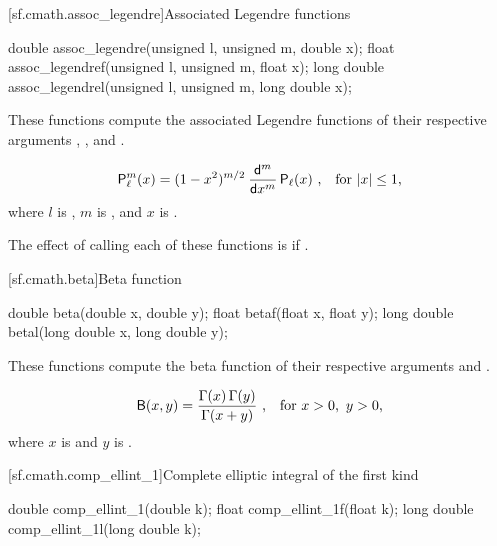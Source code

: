 [sf.cmath.assoc_legendre]{Associated Legendre functions}%
%
%
%
%
%
\begin{itemdecl}
double       assoc_legendre(unsigned l, unsigned m, double x);
float        assoc_legendref(unsigned l, unsigned m, float x);
long double  assoc_legendrel(unsigned l, unsigned m, long double x);
\end{itemdecl}

\begin{itemdescr}

\pnum\effects
These functions compute
the associated Legendre functions
of their respective arguments
, , and .

\pnum
\returns
\[ \mathsf{P}_\ell^m(x) = (1 - x^2) ^ {m/2} \:
   \frac{\mathsf{d} ^ m}{\mathsf{d}x ^ m} \, \mathsf{P}_\ell(x)
   \text{ ,\quad for $|x| \le 1$,} \]
where
$l$ is ,
$m$ is , and
$x$ is .

\pnum
\remarks
The effect of calling each of these functions
is 
if .
\end{itemdescr}

[sf.cmath.beta]{Beta function}%
%
%
%
%
%
\begin{itemdecl}
double       beta(double x, double y);
float        betaf(float x, float y);
long double  betal(long double x, long double y);
\end{itemdecl}

\begin{itemdescr}
\pnum
\effects
These functions compute
the beta function
of their respective arguments
 and .

\pnum
\returns
\[ \mathsf{B}(x, y) = \frac{\Gamma(x) \, \Gamma(y)}{\Gamma(x + y)}
   \text{ ,\quad for $x > 0$,\, $y > 0$,} \]
where
$x$ is  and
$y$ is .
\end{itemdescr}

[sf.cmath.comp_ellint_1]{Complete elliptic integral of the first kind}%
%
%
%
%
%
\begin{itemdecl}
double       comp_ellint_1(double k);
float        comp_ellint_1f(float k);
long double  comp_ellint_1l(long double k);
\end{itemdecl}

